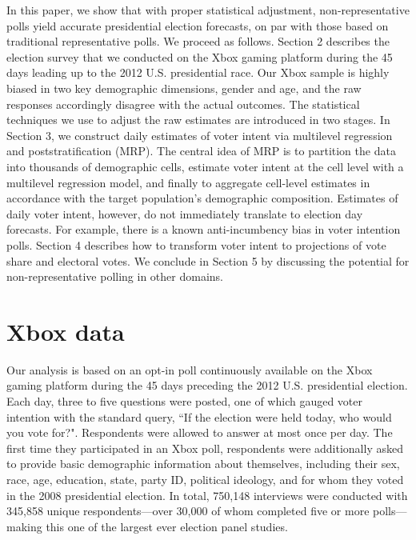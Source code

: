\documentclass[preprint,authoryear,12pt]{elsarticle}
\begin{document}
In this paper, we show that with proper statistical adjustment,
non-representative polls yield accurate presidential election forecasts, on par with
those based on traditional representative polls.
We proceed as follows. Section 2 describes the
election survey that we conducted on the Xbox gaming platform during the 45 days leading up to the
2012 U.S. presidential race.
Our Xbox sample is
highly biased in two key demographic dimensions, gender and age, and the raw
responses accordingly disagree with the actual outcomes. The statistical
techniques we use to adjust the raw estimates are introduced in two stages.
In Section 3, we construct daily estimates of
voter intent via multilevel regression and poststratification (MRP).
The central idea of MRP is to partition the data into thousands of
demographic cells, estimate voter intent at the cell level with a multilevel regression model, and finally
to aggregate cell-level estimates in accordance with the target population's demographic composition.
Estimates of daily voter intent, however, do not immediately translate to
election day forecasts. For example, there is a known anti-incumbency bias in voter intention polls.
Section 4 describes how to transform voter intent to
projections of vote share and electoral votes.
We conclude in Section 5 by discussing the potential for non-representative polling in other domains.

\section{Xbox data}
Our analysis is based on an opt-in poll continuously available on the Xbox
gaming platform during the 45 days preceding the 2012 U.S. presidential
election.  Each day, three to five questions were posted, one of which gauged
voter intention with the standard query, ``If the election were held today, who
would you vote for?".  Respondents were allowed to answer at most once per
day. The first time they participated in an Xbox poll, respondents were
additionally asked to provide basic demographic information about themselves,
including their sex, race, age, education, state, party ID, political ideology,
and for whom they voted in the 2008 presidential election. In total, 750,148
interviews were conducted with 345,858 unique respondents---over 30,000 of whom
completed five or more polls---making this one of the largest ever election
panel studies.
\end{document}
